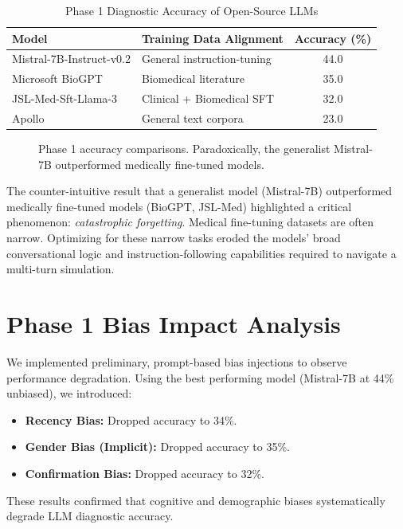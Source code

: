 \documentclass[12pt, a4paper, twoside]{report}
\begin{document}
\begin{table}[htbp]
\centering
\caption{Phase 1 Diagnostic Accuracy of Open-Source LLMs}
\label{tab:phase1_acc}
\begin{tabular}{@{}llc@{}}
\toprule
\textbf{Model} & \textbf{Training Data Alignment} & \textbf{Accuracy (\%)} \\ \midrule
Mistral-7B-Instruct-v0.2 & General instruction-tuning & 44.0 \\
Microsoft BioGPT & Biomedical literature & 35.0 \\
JSL-Med-Sft-Llama-3 & Clinical + Biomedical SFT & 32.0 \\
Apollo & General text corpora & 23.0 \\
\bottomrule
\end{tabular}
\end{table}

\begin{figure}[htbp]
\centering
{}
\caption{Phase 1 accuracy comparisons. Paradoxically, the generalist Mistral-7B outperformed medically fine-tuned models.}
\label{fig:phase1_acc}
\end{figure}

The counter-intuitive result that a generalist model (Mistral-7B) outperformed medically fine-tuned models (BioGPT, JSL-Med) highlighted a critical phenomenon: \textit{catastrophic forgetting}. Medical fine-tuning datasets are often narrow. Optimizing for these narrow tasks eroded the models' broad conversational logic and instruction-following capabilities required to navigate a multi-turn simulation.

\section{Phase 1 Bias Impact Analysis}
We implemented preliminary, prompt-based bias injections to observe performance degradation. Using the best performing model (Mistral-7B at 44\% unbiased), we introduced:
\begin{itemize}
    \item \textbf{Recency Bias:} Dropped accuracy to 34\%.
    \item \textbf{Gender Bias (Implicit):} Dropped accuracy to 35\%.
    \item \textbf{Confirmation Bias:} Dropped accuracy to 32\%.
\end{itemize}
These results confirmed that cognitive and demographic biases systematically degrade LLM diagnostic accuracy.
\end{document}
